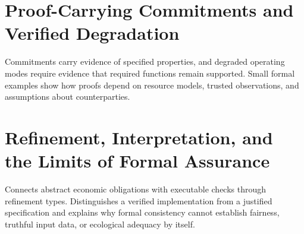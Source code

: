 \chapter{Proof-Carrying Commitments and Verified Degradation}\label{ch:54}
Commitments carry evidence of specified properties, and degraded operating modes require evidence that required functions remain supported. Small formal examples show how proofs depend on resource models, trusted observations, and assumptions about counterparties.
\scaffold

\chapter{Refinement, Interpretation, and the Limits of Formal Assurance}\label{ch:55}
Connects abstract economic obligations with executable checks through refinement types. Distinguishes a verified implementation from a justified specification and explains why formal consistency cannot establish fairness, truthful input data, or ecological adequacy by itself.
\scaffold

